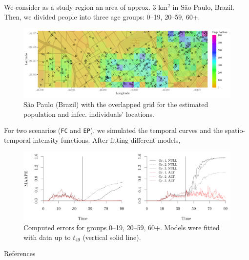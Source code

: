 \documentclass[12pt]{beamer}
\begin{document}
\begin{frame}[t]
\begin{columns}[t]
\begin{column}{0.24175\textwidth}
\begin{block}{}
				We consider as a study region an area of approx. 3 km${}^{2}$ in São Paulo, Brazil. Then, we divided people into three age groups: 0--19, 20--59, 60+.
				
				\begin{figure}[!ht]
					\centering\vspace{-3pt}
					\includegraphics[width = 1\textwidth]{Images/map.png}\vspace{-12pt}
					\caption{\justifying São Paulo (Brazil) with the overlapped grid for the estimated population and infec. individuals' locations.}
					\label{fig:map}
				\end{figure}
			
				\vspace{-3pt}
			
				For two scenarios (\texttt{FC} and \texttt{EP}), we simulated the temporal curves and the spatio-temporal intensity functions. After fitting different models,
				\begin{figure}[!ht]
					\centering
					\includegraphics[width = 1\textwidth]{Images/computed_errors.png}\vspace{-6pt}
					\caption{\justifying Computed errors for groups 0--19, 20--59, 60+. Models were fitted with data up to $t_{49}$ (vertical solid line).}
					\label{fig:computederrors}
				\end{figure}
				
				\vspace{15pt}
				
				{\textcolor{strong-blue}{References}} \justifying \vspace{12pt} \tiny
				
				
				\end{block}	
							
			\end{column}
		
		\end{columns}
	\end{frame}
\end{document}

